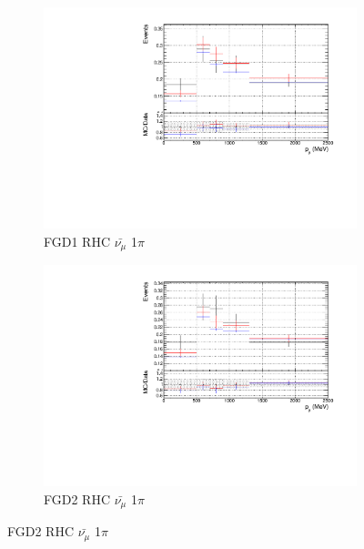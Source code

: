 \begin{figure}[!h]
\begin{subfigure}{0.49\textwidth}
  \centering
  \includegraphics[width=\textwidth]{figs/priorpred1D_p_FGD1_anti-numuCC_1pi}
  \caption{FGD1 RHC $\bar{\nu_{\mu}}$ 1$\pi$}
\end{subfigure}
\centering
\begin{subfigure}{0.49\textwidth}
  \centering
  \includegraphics[width=\textwidth]{figs/priorpred1D_p_FGD2_anti-numuCC_1pi}
  \caption{FGD2 RHC $\bar{\nu_{\mu}}$ 1$\pi$}
\end{subfigure}


\end{figure}
